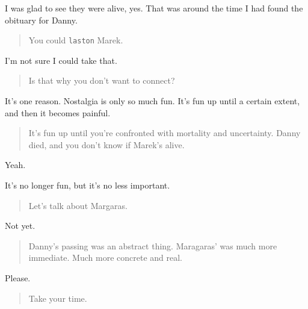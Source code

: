 I was glad to see they were alive, yes. That was around the time I had found the obituary for Danny.

\begin{quote}
You could \texttt{laston} Marek.
\end{quote}

I'm not sure I could take that.

\begin{quote}
Is that why you don't want to connect?
\end{quote}

It's one reason. Nostalgia is only so much fun. It's fun up until a certain extent, and then it becomes painful.

\begin{quote}
It's fun up until you're confronted with mortality and uncertainty. Danny died, and you don't know if Marek's alive.
\end{quote}

Yeah.

It's no longer fun, but it's no less important.

\begin{quote}
Let's talk about Margaras.
\end{quote}

Not yet.

\begin{quote}
Danny's passing was an abstract thing. Maragaras' was much more immediate. Much more concrete and real.
\end{quote}

Please.

\begin{quote}
Take your time.
\end{quote}
